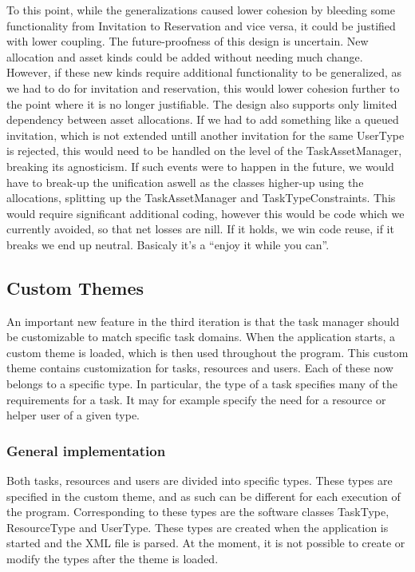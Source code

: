 				To this point, while the generalizations caused lower cohesion by bleeding some functionality from Invitation to Reservation and vice versa, it could be justified with lower coupling. The future-proofness of this design is uncertain. New allocation and asset kinds could be added without needing much change. However, if these new kinds require additional functionality to be generalized, as we had to do for invitation and reservation, this would lower cohesion further to the point where it is no longer justifiable. The design also supports only limited dependency between asset allocations. If we had to add something like a queued invitation, which is not extended untill another invitation for the same UserType is rejected, this would need to be handled on the level of the TaskAssetManager, breaking its agnosticism. If such events were to happen in the future, we would have to break-up the unification aswell as the classes higher-up using the allocations, splitting up the TaskAssetManager and TaskTypeConstraints. This would require significant additional coding, however this would be code which we currently avoided, so that net losses are nill. If it holds, we win code reuse, if it breaks we end up neutral. Basicaly it's a ``enjoy it while you can''.
				
				
				
		
		
		
		
		\subsection{Custom Themes}
			An important new feature in the third iteration is that the task manager should be customizable to match specific task domains. When the application starts, a custom theme is loaded, which is then used throughout the program. This custom theme contains customization for tasks, resources and users. Each of these now belongs to a specific type. In particular, the type of a task specifies many of the requirements for a task. It may for example specify the need for a resource or helper user of a given type.
			\subsubsection{General implementation}
				Both tasks, resources and users are divided into specific types. These types are specified in the custom theme, and as such can be different for each execution of the program. Corresponding to these types are the software classes TaskType, ResourceType and UserType. These types are created when the application is started and the XML file is parsed. At the moment, it is not possible to create or modify the types after the theme is loaded. 
				
